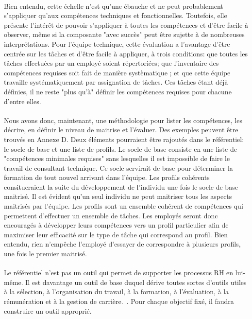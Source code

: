 \paragraph{}Bien entendu, cette échelle n'est qu'une ébauche et ne peut probablement s'appliquer qu'aux compétences techniques et fonctionnelles. Toutefois, elle présente l'intérêt de pouvoir s'appliquer à toutes les compétences et d'être facile à observer, même si la composante "avec succès" peut être sujette à de nombreuses interprétations. Pour l'équipe technique, cette évaluation a l'avantage d'être centrée sur les tâches et d'être facile à appliquer, à trois conditions: que toutes les tâches effectuées par un employé soient répertoriées; que l'inventaire des compétences requises soit fait de manière systèmatique ; et que cette équipe travaille systématiquement par assignation de tâches. Ces tâches étant déjà définies, il ne reste "plus qu'à" définir les compétences requises pour chacune d'entre elles. 

\paragraph{} Nous avons donc, maintenant, une méthodologie pour lister les compétences, les décrire, en définir le niveau de maitrise et l'évaluer. Des exemples peuvent être trouvés en Annexe D. Deux éléments pourraient être rajoutés dans le référentiel: le socle de base et une liste de profils. Le socle de base consiste en une liste de "compétences minimales requises" sans lesquelles il est impossible de faire le travail de consultant technique. Ce socle servirait de base pour déterminer la formation de tout nouvel arrivant dans l'équipe. Les profils cohérents consitueraient la suite du développement de l'individu une fois le socle de base maitrisé. Il est évident qu'un seul individu ne peut maitriser tous les aspects maitrisés par l'équipe. Les profils sont un ensemble cohérent de compétences qui permettent d'effectuer un ensemble de tâches. Les employés seront donc encouragés à développer leurs compétences vers un profil particulier afin de maximiser leur efficacité sur le type de tâche qui correspond au profil. Bien entendu, rien n'empêche l'employé d'essayer de correspondre à plusieurs profils, une fois le premier maitrisé.  


\paragraph{}Le référentiel n'est pas un outil qui permet de supporter les processus RH en lui-même. Il est davantage un outil de base duquel dérive toutes sortes d'outils utiles à la sélection, à l'organisation du travail, à la formation, à l'évaluation, à la rémunération et à la gestion de carrière.~\citep[pp.29]{refcompetence}. Pour chaque objectif fixé, il faudra construire un outil approprié. 

